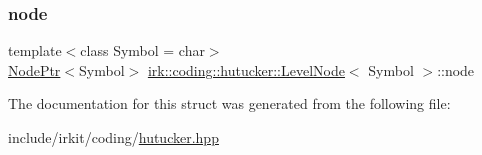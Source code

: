 \subsubsection{\texorpdfstring{node}{node}}
{\footnotesize\ttfamily template$<$class Symbol = char$>$ \\
\mbox{\hyperlink{namespaceirk_1_1coding_1_1hutucker_a4faf15998757218857b5b24845cbedb7}{Node\+Ptr}}$<$Symbol$>$ \mbox{\hyperlink{structirk_1_1coding_1_1hutucker_1_1LevelNode}{irk\+::coding\+::hutucker\+::\+Level\+Node}}$<$ Symbol $>$\+::node}



The documentation for this struct was generated from the following file\+:\begin{DoxyCompactItemize}
\item 
include/irkit/coding/\mbox{\hyperlink{hutucker_8hpp}{hutucker.\+hpp}}\end{DoxyCompactItemize}

